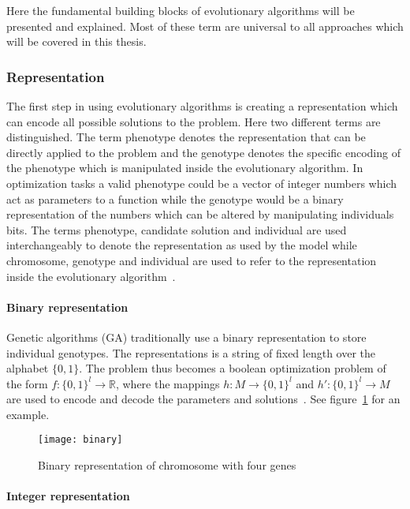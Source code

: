 Here the fundamental building blocks of evolutionary algorithms will be presented and explained. Most of these term are universal to all approaches which will be covered in this thesis.

\subsubsection{Representation}

The first step in using evolutionary algorithms is creating a representation which can encode all possible solutions to the problem. Here two different terms are distinguished. The term phenotype denotes the representation that can be directly applied to the problem and the genotype denotes the specific encoding of the phenotype which is manipulated inside the evolutionary algorithm. In optimization tasks a valid phenotype could be a vector of integer numbers which act as parameters to a function while the genotype would be a binary representation of the numbers which can be altered by manipulating individuals bits. The terms phenotype, candidate solution and individual are used interchangeably to denote the representation as used by the model while chromosome, genotype and individual are used to refer to the representation inside the evolutionary algorithm~\cite{Eiben2015_whatevolutionary}.

\paragraph{Binary representation}

Genetic algorithms (GA) traditionally use a binary representation to store individual genotypes. The representations is a string of fixed length over the alphabet $\{0,1\}$. The problem thus becomes a boolean optimization problem of the form $ f:\{0,1\}^l \rightarrow \mathbb{R}$, where the mappings $h:M \rightarrow \{0,1\}^l$ and $h':\{0,1\}^l \rightarrow M$ are used to encode and decode the parameters and solutions~\cite{back1997evolutionary}. See figure~\ref{fig:bin} for an example.

\begin{figure}[H]
  \centering
  \texttt{[image: binary]}
  \caption{Binary representation of chromosome with four genes}
  \label{fig:bin}
\end{figure}

\paragraph{Integer representation}

